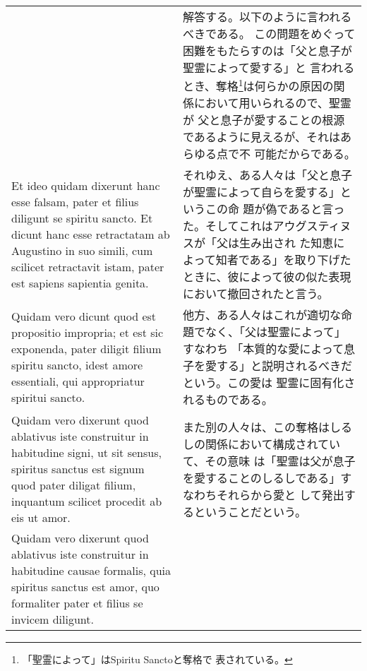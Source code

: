 \documentclass[10pt]{jsarticle} %
\begin{document}
\begin{longtable}{p{21em}p{21em}}
&

解答する。以下のように言われるべきである。
この問題をめぐって困難をもたらすのは「父と息子が聖霊によって愛する」と
 言われるとき、奪格\footnote{「聖霊によって」はSpiritu Sanctoと奪格で
 表されている。}は何らかの原因の関係において用いられるので、聖霊が
 父と息子が愛することの根源であるように見えるが、それはあらゆる点で不
 可能だからである。

\\


Et ideo quidam dixerunt hanc esse
 falsam, pater et filius diligunt se spiritu sancto. Et dicunt hanc
 esse retractatam ab Augustino in suo simili, cum scilicet retractavit
 istam, pater est sapiens sapientia genita. 

&

それゆえ、ある人々は「父と息子が聖霊によって自らを愛する」というこの命
 題が偽であると言った。そしてこれはアウグスティヌスが「父は生み出され
 た知恵によって知者である」を取り下げたときに、彼によって彼の似た表現
 において撤回されたと言う。


\\



Quidam vero dicunt quod
 est propositio impropria; et est sic exponenda, pater diligit filium
 spiritu sancto, idest amore essentiali, qui appropriatur spiritui
 sancto. 

&

他方、ある人々はこれが適切な命題でなく、「父は聖霊によって」すなわち
 「本質的な愛によって息子を愛する」と説明されるべきだという。この愛は
 聖霊に固有化されるものである。

\\


Quidam vero dixerunt quod ablativus iste construitur in
 habitudine signi, ut sit sensus, spiritus sanctus est signum quod
 pater diligat filium, inquantum scilicet procedit ab eis ut
 amor. 

&

また別の人々は、この奪格はしるしの関係において構成されていて、その意味
 は「聖霊は父が息子を愛することのしるしである」すなわちそれらから愛と
 して発出するということだという。

\\



Quidam vero dixerunt quod ablativus iste construitur in
 habitudine causae formalis, quia spiritus sanctus est amor, quo
 formaliter pater et filius se invicem diligunt. 


\end{longtable}
\end{document}
